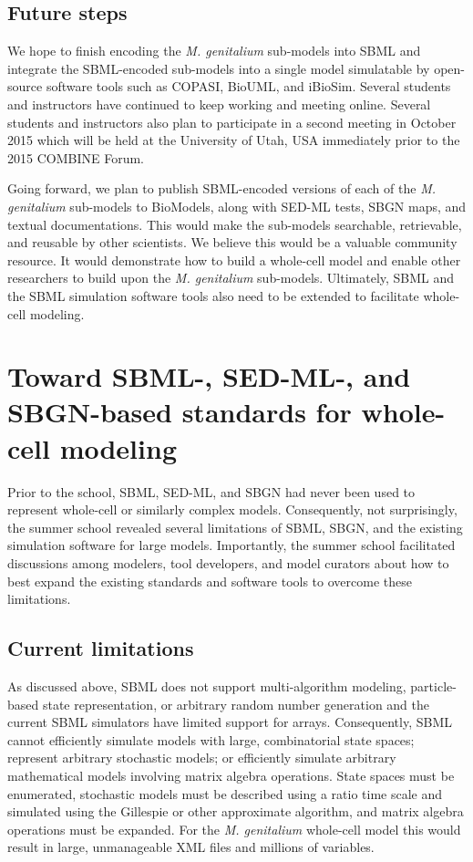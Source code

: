 \documentclass[journal,transmag]{IEEEtran}
\begin{document}
\subsection{Future steps}
We hope to finish encoding the \textit{M. genitalium} sub-models into SBML and integrate the SBML-encoded sub-models into a single model simulatable by open-source software tools such as COPASI, BioUML, and iBioSim. Several students and instructors have continued to keep working and meeting online. Several students and instructors also plan to participate in a second meeting in October 2015 which will be held at the University of Utah, USA immediately prior to the 2015 COMBINE Forum.

Going forward, we plan to publish SBML-encoded versions of each of the \textit{M. genitalium} sub-models to BioModels, along with SED-ML tests, SBGN maps, and textual documentations. This would make the sub-models searchable, retrievable, and reusable by other scientists. We believe this would be a valuable community resource. It would demonstrate how to build a whole-cell model and enable other researchers to build upon the \textit{M. genitalium} sub-models. Ultimately, SBML and the SBML simulation software tools also need to be extended to facilitate whole-cell modeling.


\section{Toward SBML-, SED-ML-, and SBGN-based standards for whole-cell modeling}
Prior to the school, SBML, SED-ML, and SBGN had never been used to represent whole-cell or similarly complex models. Consequently, not surprisingly, the summer school revealed several limitations of SBML, SBGN, and the existing simulation software for large models. Importantly, the summer school facilitated discussions among modelers, tool developers, and model curators about how to best expand the existing standards and software tools to overcome these limitations.

\subsection{Current limitations}
As discussed above, SBML does not support multi-algorithm modeling, particle-based state representation, or arbitrary random number generation and the current SBML simulators have limited support for arrays. Consequently, SBML cannot efficiently simulate models with large, combinatorial state spaces; represent arbitrary stochastic models; or efficiently simulate arbitrary mathematical models involving matrix algebra operations. State spaces must be enumerated, stochastic models must be described using a ratio time scale and simulated using the Gillespie or other approximate algorithm, and matrix algebra operations must be expanded. For the \textit{M. genitalium} whole-cell model this would result in large, unmanageable XML files and millions of variables.
\end{document}

